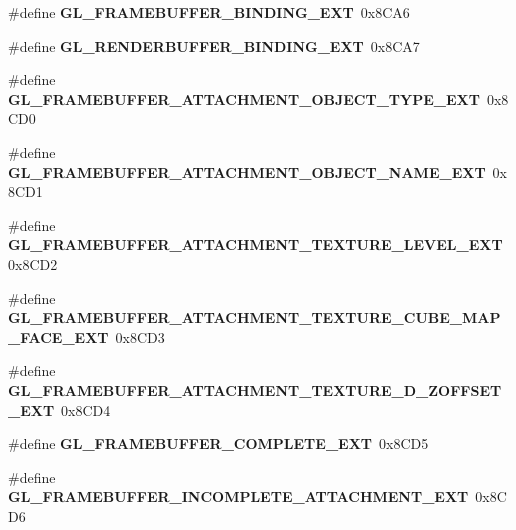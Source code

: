 \begin{DoxyCompactItemize}
\item 
\#define {\bfseries G\+L\+\_\+\+F\+R\+A\+M\+E\+B\+U\+F\+F\+E\+R\+\_\+\+B\+I\+N\+D\+I\+N\+G\+\_\+\+E\+X\+T}~0x8\+C\+A6\label{_s_d_l__opengl_8h_aa2f842365229a5a10fdafc445dadf777}

\item 
\#define {\bfseries G\+L\+\_\+\+R\+E\+N\+D\+E\+R\+B\+U\+F\+F\+E\+R\+\_\+\+B\+I\+N\+D\+I\+N\+G\+\_\+\+E\+X\+T}~0x8\+C\+A7\label{_s_d_l__opengl_8h_a639b760af8be828ef3c99dcc0577db70}

\item 
\#define {\bfseries G\+L\+\_\+\+F\+R\+A\+M\+E\+B\+U\+F\+F\+E\+R\+\_\+\+A\+T\+T\+A\+C\+H\+M\+E\+N\+T\+\_\+\+O\+B\+J\+E\+C\+T\+\_\+\+T\+Y\+P\+E\+\_\+\+E\+X\+T}~0x8\+C\+D0\label{_s_d_l__opengl_8h_a57188ec3e667a0ff2e4295b18bf9c011}

\item 
\#define {\bfseries G\+L\+\_\+\+F\+R\+A\+M\+E\+B\+U\+F\+F\+E\+R\+\_\+\+A\+T\+T\+A\+C\+H\+M\+E\+N\+T\+\_\+\+O\+B\+J\+E\+C\+T\+\_\+\+N\+A\+M\+E\+\_\+\+E\+X\+T}~0x8\+C\+D1\label{_s_d_l__opengl_8h_aea11419a9b191790fe3414b6f329535c}

\item 
\#define {\bfseries G\+L\+\_\+\+F\+R\+A\+M\+E\+B\+U\+F\+F\+E\+R\+\_\+\+A\+T\+T\+A\+C\+H\+M\+E\+N\+T\+\_\+\+T\+E\+X\+T\+U\+R\+E\+\_\+\+L\+E\+V\+E\+L\+\_\+\+E\+X\+T}~0x8\+C\+D2\label{_s_d_l__opengl_8h_a38a86ff657d1bb669c30d5d71328a49a}

\item 
\#define {\bfseries G\+L\+\_\+\+F\+R\+A\+M\+E\+B\+U\+F\+F\+E\+R\+\_\+\+A\+T\+T\+A\+C\+H\+M\+E\+N\+T\+\_\+\+T\+E\+X\+T\+U\+R\+E\+\_\+\+C\+U\+B\+E\+\_\+\+M\+A\+P\+\_\+\+F\+A\+C\+E\+\_\+\+E\+X\+T}~0x8\+C\+D3\label{_s_d_l__opengl_8h_a770d657a3b2065f9f3d86b73112d7520}

\item 
\#define {\bfseries G\+L\+\_\+\+F\+R\+A\+M\+E\+B\+U\+F\+F\+E\+R\+\_\+\+A\+T\+T\+A\+C\+H\+M\+E\+N\+T\+\_\+\+T\+E\+X\+T\+U\+R\+E\+\_\+D\+\_\+\+Z\+O\+F\+F\+S\+E\+T\+\_\+\+E\+X\+T}~0x8\+C\+D4\label{_s_d_l__opengl_8h_afb4c713e2e7c1eaa4b60735d4a1f0dd1}

\item 
\#define {\bfseries G\+L\+\_\+\+F\+R\+A\+M\+E\+B\+U\+F\+F\+E\+R\+\_\+\+C\+O\+M\+P\+L\+E\+T\+E\+\_\+\+E\+X\+T}~0x8\+C\+D5\label{_s_d_l__opengl_8h_a4e59e117d25bea953dfa017e08d1c3d3}

\item 
\#define {\bfseries G\+L\+\_\+\+F\+R\+A\+M\+E\+B\+U\+F\+F\+E\+R\+\_\+\+I\+N\+C\+O\+M\+P\+L\+E\+T\+E\+\_\+\+A\+T\+T\+A\+C\+H\+M\+E\+N\+T\+\_\+\+E\+X\+T}~0x8\+C\+D6\label{_s_d_l__opengl_8h_a268da796c680af213faff739cfdd91b9}


\end{DoxyCompactItemize}
